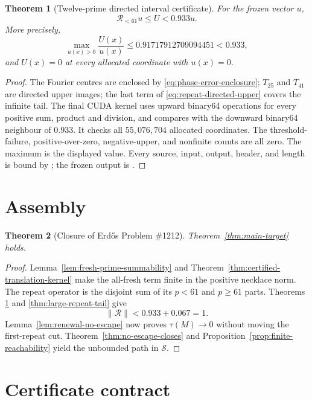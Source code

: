 \documentclass[11pt]{article}
\newtheorem{theorem}{Theorem}[section]
\theoremstyle{definition}
\theoremstyle{remark}
\newcommand{\cS}{\mathcal S}
\begin{document}
\begin{theorem}[Twelve-prime directed interval certificate]
\label{thm:repeat-twelve-interval}
For the frozen vector $u$,
\[
 \mathcal R_{<61}u\leq U<0.933u.
\]
More precisely,
\[
 \max_{u(x)>0}\frac{U(x)}{u(x)}
 \leq0.91717912709094451<0.933,
\]
and $U(x)=0$ at every allocated coordinate with $u(x)=0$.
\end{theorem}

\begin{proof}
The Fourier centres are enclosed by
\eqref{eq:phase-error-enclosure}; $T_{25}$ and $T_{41}$ are directed upper
images; the last term of \eqref{eq:repeat-directed-upper} covers the infinite
tail.  The final CUDA kernel uses upward binary64 operations for every
positive sum, product and division, and compares with the downward binary64
neighbour of $0.933$.  It checks all $55{,}076{,}704$ allocated coordinates.
The threshold-failure, positive-over-zero, negative-upper, and nonfinite
counts are all zero.  The maximum is the displayed value.  Every source,
input, output, header, and length is bound by
; the frozen output is
.
\end{proof}

\section{Assembly}

\begin{theorem}[Closure of Erd\H{o}s Problem \#1212]
\label{thm:erdos1212-close}
Theorem~\ref{thm:main-target} holds.
\end{theorem}

\begin{proof}
Lemma~\ref{lem:fresh-prime-summability} and
Theorem~\ref{thm:certified-translation-kernel} make the all-fresh term finite
in the positive necklace norm.  The repeat operator is the disjoint sum of
its $p<61$ and $p\geq61$ parts.  Theorems
\ref{thm:repeat-twelve-interval} and \ref{thm:large-repeat-tail} give
\[
 \|\mathcal R\|<0.933+0.067=1.
\]
Lemma~\ref{lem:renewal-no-escape} now proves $\tau(M)\to0$ without moving the
first-repeat cut.  Theorem~\ref{thm:no-escape-closes} and
Proposition~\ref{prop:finite-reachability} yield the unbounded path in $\cS$.
\end{proof}

\section{Certificate contract}
\end{document}
